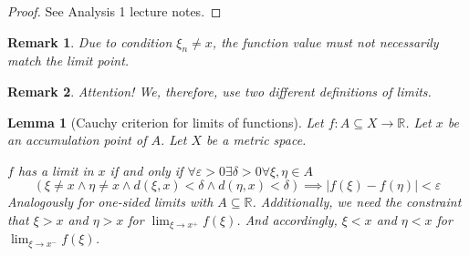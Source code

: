 \documentclass{article}
\newtheorem{lemma}{Lemma}  \numberwithin{lemma}{section}
\newtheorem{remark}{Remark}  \numberwithin{remark}{section}
\newcommand{\card}[1]{\left|#1\right|}
\begin{document}
\begin{proof}
  See Analysis 1 lecture notes.
\end{proof}

\begin{remark}
  Due to condition $\xi_n \neq x$, the function value must not necessarily match the limit point.
\end{remark}

\begin{remark}
  Attention! We, therefore, use two different definitions of limits.
\end{remark}

\begin{lemma}[Cauchy criterion for limits of functions] %
  \label{cauchy-crit}
  Let $f: A \subseteq X \to \mathbb R$. Let $x$ be an accumulation point of $A$.
  Let $X$ be a metric space.

  \emph{$f$ has a limit in $x$} if and only if $\forall \varepsilon > 0 \exists \delta > 0 \forall \xi, \eta \in A$
  \[
    (\xi \neq x \land \eta \neq x \land d(\xi, x) < \delta \land d(\eta, x) < \delta)
    \implies \card{f(\xi) - f(\eta)} < \varepsilon
  \]
  Analogously for one-sided limits with $A \subseteq \mathbb R$.
  Additionally, we need the constraint that $\xi > x$ and $\eta > x$ for $\lim_{\xi \to x^+} f(\xi)$.
  And accordingly, $\xi < x$ and $\eta < x$ for $\lim_{\xi \to x^-} f(\xi)$.
\end{lemma}
\end{document}
